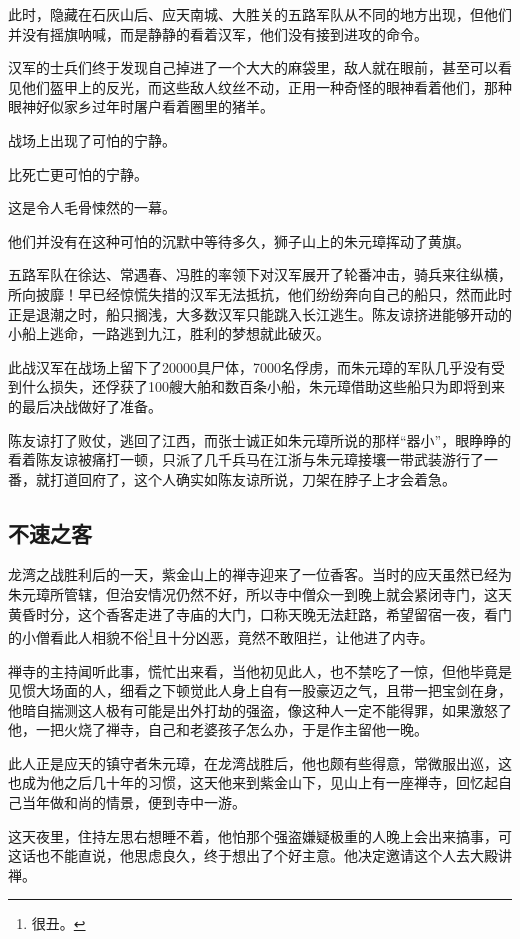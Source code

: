 \begin{multicols}{\theparacolNo}
		此时，隐藏在石灰山后、应天南城、大胜关的五路军队从不同的地方出现，但他们并没有摇旗呐喊，而是静静的看着汉军，他们没有接到进攻的命令。

		汉军的士兵们终于发现自己掉进了一个大大的麻袋里，敌人就在眼前，甚至可以看见他们盔甲上的反光，而这些敌人纹丝不动，正用一种奇怪的眼神看着他们，那种眼神好似家乡过年时屠户看着圈里的猪羊。

		战场上出现了可怕的宁静。

		比死亡更可怕的宁静。

		这是令人毛骨悚然的一幕。

		他们并没有在这种可怕的沉默中等待多久，狮子山上的朱元璋挥动了黄旗。

		五路军队在徐达、常遇春、冯胜的率领下对汉军展开了轮番冲击，骑兵来往纵横，所向披靡！早已经惊慌失措的汉军无法抵抗，他们纷纷奔向自己的船只，然而此时正是退潮之时，船只搁浅，大多数汉军只能跳入长江逃生。陈友谅挤进能够开动的小船上逃命，一路逃到九江，胜利的梦想就此破灭。

		此战汉军在战场上留下了20000具尸体，7000名俘虏，而朱元璋的军队几乎没有受到什么损失，还俘获了100艘大舶和数百条小船，朱元璋借助这些船只为即将到来的最后决战做好了准备。

		陈友谅打了败仗，逃回了江西，而张士诚正如朱元璋所说的那样“器小”，眼睁睁的看着陈友谅被痛打一顿，只派了几千兵马在江浙与朱元璋接壤一带武装游行了一番，就打道回府了，这个人确实如陈友谅所说，刀架在脖子上才会着急。

		\subsection{不速之客}
		龙湾之战胜利后的一天，紫金山上的禅寺迎来了一位香客。当时的应天虽然已经为朱元璋所管辖，但治安情况仍然不好，所以寺中僧众一到晚上就会紧闭寺门，这天黄昏时分，这个香客走进了寺庙的大门，口称天晚无法赶路，希望留宿一夜，看门的小僧看此人相貌不俗\footnote{很丑。}且十分凶恶，竟然不敢阻拦，让他进了内寺。

		禅寺的主持闻听此事，慌忙出来看，当他初见此人，也不禁吃了一惊，但他毕竟是见惯大场面的人，细看之下顿觉此人身上自有一股豪迈之气，且带一把宝剑在身，他暗自揣测这人极有可能是出外打劫的强盗，像这种人一定不能得罪，如果激怒了他，一把火烧了禅寺，自己和老婆孩子怎么办，于是作主留他一晚。

		此人正是应天的镇守者朱元璋，在龙湾战胜后，他也颇有些得意，常微服出巡，这也成为他之后几十年的习惯，这天他来到紫金山下，见山上有一座禅寺，回忆起自己当年做和尚的情景，便到寺中一游。

		这天夜里，住持左思右想睡不着，他怕那个强盗嫌疑极重的人晚上会出来搞事，可这话也不能直说，他思虑良久，终于想出了个好主意。他决定邀请这个人去大殿讲禅。


\end{multicols}
